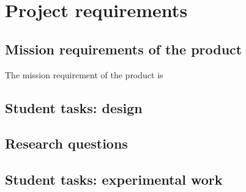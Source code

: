 
\section{Project requirements}


\subsection{Mission requirements of the product}
The mission requirement of the product is
\subsection{Student tasks: design}

\vspace{1em}

\subsection{Research questions}

\subsection{Student tasks: experimental work}

\newpage 



